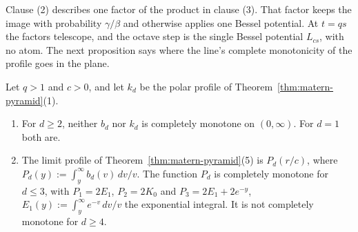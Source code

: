Clause (2) describes one factor of the product in clause (3). That factor keeps the image
with probability $\gamma/\beta$ and otherwise applies one Bessel potential. At $t = qs$ the factors
telescope, and the octave step is the single Bessel potential $L_{cs}$, with no atom. The next
proposition says where the line's complete monotonicity of the profile goes in the plane.

\begin{proposition}
\label{prop:thorin-in-dimension-d}
\leanok
Let $q > 1$ and $c > 0$, and let $k_d$ be the polar profile of Theorem~\ref{thm:matern-pyramid}(1).
\begin{enumerate}
\item For $d \ge 2$, neither $b_d$ nor $k_d$ is completely monotone on $(0, \infty)$. For $d = 1$
both are.
\item The limit profile of Theorem~\ref{thm:matern-pyramid}(5) is $P_d(r/c)$, where
$P_d(y) := \int_y^\infty b_d(v)\,dv/v$. The function $P_d$ is completely monotone for $d \le 3$, with
$P_1 = 2E_1$, $P_2 = 2K_0$ and $P_3 = 2E_1 + 2e^{-y}$, $E_1(y) := \int_y^\infty e^{-v}\,dv/v$ the
exponential integral. It is not completely monotone for $d \ge 4$.
\end{enumerate}

\end{proposition}
